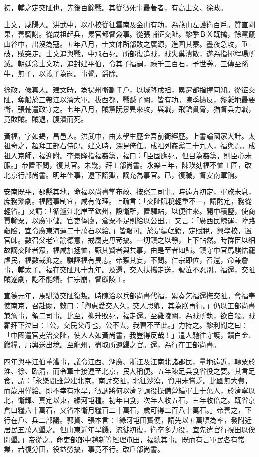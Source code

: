 \begin{pinyinscope}
初，輔之定交阯也，先後百餘戰。其從徵死事最著者，有高士文、徐政。

士文，咸陽人。洪武中，以小校從征雲南及金山有功，為燕山左護衛百戶。質直剛果，善騎謝。從成祖起兵，累官都督僉事。從張輔征交阯。黎季ＢＸ既擒，餘黨竄山谷中，出沒為寇。五年八月，士文帥所部敗之廣源，進圍其寨。晝夜急攻，垂破，賊突走。士文追與戰，中飛石死。所部復追賊，賊失巢潰散，遂為指揮程瑒所滅。朝廷念士文功，追封建平伯，令其子福嗣，祿千三百石，予世券。三傳至孫牛，無子，以義子為嗣。事覺，爵除。

徐政，儀真人。建文時，為揚州衛副千戶，以城降成祖，累遷都指揮同知。從征交阯，奪船於三帶江以濟大軍。拔西都，戰鹹子關，皆有功。陳季擴反，盤灘地最要衝，張輔遣政守之。七年八月，賊黨阮景異來攻，與戰，飛鎗貫脅，猶督兵力戰，竟敗賊。賊退，腹潰而死。

黃福，字如錫，昌邑人。洪武中，由太學生歷金吾前衛經歷。上書論國家大計。太祖奇之，超拜工部右侍郎。建文時，深見倚任。成祖列姦黨二十九人，福與焉。成祖入京師，福迎附。李景隆指福姦黨，福曰：「臣固應死，但目為姦黨，則臣心未服。」帝置不問，復其官。未幾，拜工部尚書。永樂三年，陳瑛劾福不恤工匠，改北京行部尚書。明年坐事，逮下詔獄，謫充為事官。已，復職，督安南軍餉。

安南既平，郡縣其地，命福以尚書掌布政、按察二司事。時遠方初定，軍旅未息，庶務繁劇。福隨事制宜，咸有條理。上疏言：「交阯賦稅輕重不一，請酌定，務從輕省。」又請：「循瀘江北岸至欽州，設衛所，置驛站，以便往來。開中積鹽，使商賈輸粟，以廣軍儲。官吏俸廩，倉粟不足則給以公田。」又言：「廣西民餽運，陸路艱險，宜令廣東海運二十萬石以給。」皆報可。於是編氓籍，定賦稅，興學校，置官師。數召父老宣諭德意，戒屬吏毋苛擾。一切鎮之以靜，上下帖然。時群臣以細故謫交阯者眾，福咸加拯恤，甄其賢者與共事，由是至者如歸。鎮守中官馬騏怙寵虐民，福數裁抑之。騏誣福有異志。帝察其妄，不問。仁宗即位，召還，命兼詹事，輔太子。福在交阯凡十九年。及還，交人扶攜走送，號泣不忍別。福還，交阯賊遂劇，訖不能靖。仁宗崩，督獻陵工。

宣德元年，馬騏激交阯復叛。時陳洽以兵部尚書代福，累奏乞福還撫交阯。會福奉使南京，召赴闕，敕曰：「卿惠愛交人久，交人思卿，其為朕再行。」仍以工部尚書兼詹事，領二司事。比至，柳升敗死，福走還。至雞陵關，為賊所執，欲自殺。賊羅拜下泣曰：「公，交民父母也，公不去，我曹不至此。」力持之。黎利聞之曰：「中國遣官吏治交阯，使人人如黃尚書，我豈得反哉！」遣人馳往守護，饋白金、餱糧，肩輿送出境。至龍州，盡取所遺歸之官。還，為行在工部尚書。

四年與平江伯董漕事，議令江西、湖廣、浙江及江南北諸郡民，量地遠近，轉粟於淮、徐、臨清，而令軍士接運至北京，民大稱便。五年陳足兵食省役之要。其言足食，謂：「永樂間雖營建北京，南討交阯，北征沙漠，資用未嘗乏。比國無大費，而歲用僅給。即不幸有水旱，徵調將何以濟？請役操備營繕軍士十萬人，於濟寧以北，衛輝、真定以東，緣河屯種。初年自食，次年人收五石，三年收倍之。既省京倉口糧六十萬石，又省本衛月糧百二十萬石，歲可得二百八十萬石。」帝善之，下行在戶、兵二部議。郭資、張本言：「緣河屯田實便，請先以五萬頃為率，發附近居民五萬人墾之。但山東近年旱饑，流徙初復，衛卒多力役，宜先遣官行視田以俟開墾。」帝從之。命吏部郎中趙新等經理屯田，福總其事。既而有言軍民各有常業，若復分田，役益勞擾，事竟不行。改戶部尚書。


\end{pinyinscope}
